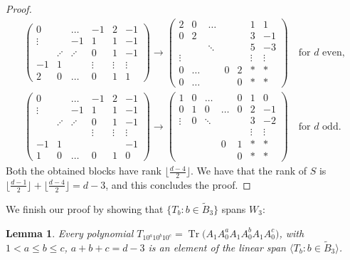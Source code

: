 \documentclass[pdftex]{sigma}
\numberwithin{equation}{section}
\newtheorem{Lemma}[Theorem]{Lemma}
\DeclareMathOperator{\Tr}{Tr}
\begin{document}
\begin{proof}
\begin{gather*}
 \begin{pmatrix}
0 	&	& \dots  & -1 & 2 & -1 \\
\vdots& 	&     -1   & 1 & 1 & -1 \\
&  	\iddots	& \iddots& 0 & 1 & -1 \\
 -1&  1  	&		 &\vdots&\vdots&\vdots\\
 2 &0& \dots &0&1&1
 \end{pmatrix} \to
 \begin{pmatrix}
 2 & 0 & \dots &&& 1 & 1\\
 0 & 2 & &&&3&-1\\
   &  & \ddots&&&5&-3\\
 \vdots & &&&&\vdots&\vdots\\
 0 &\dots&&0&2&*& *\\
 0 &\dots&&&0&*& *
 \end{pmatrix}\quad \text{for }d \text{ even},
\\
 \begin{pmatrix}
0 	&	& \dots  & -1 & 2 & -1 \\
\vdots& 	&       -1 & 1 & 1 & -1 \\
&  	\iddots	& \iddots& 0 & 1 & -1 \\
&    	&		 &\vdots&\vdots&\vdots\\
-1& 1 & &&&-1\\
1 &0& \dots &0&1&0
 \end{pmatrix} \to
\begin{pmatrix}
1       & 0 &\dots&     &0 &1 &0 \\
0       & 1 & 0       &\dots&0 &2 &-1\\
\vdots  & 0 &\ddots   &&&3&-2\\
 &  &&&&\vdots&\vdots\\
 &&&0&1&*&*\\
 &&&&0&*&*
 \end{pmatrix}\quad \text{for }d\text{ odd}.
 \end{gather*}
Both the obtained blocks have rank $\big\lfloor \frac{d-4}{2}\big\rfloor$. We have that the rank of $S$ is $\big\lfloor \frac{d-1}{2}\big\rfloor+\big\lfloor \frac{d-4}{2}\big\rfloor=d-3$, and this concludes the proof.
\end{proof}

We finish our proof by showing that $\big\{T_b\colon b\in \tilde{B}_3\big\}$ spans $W_3$:
\begin{Lemma}\label{lemma:w3Spanning}
	Every polynomial
	 $T_{10^a10^b10^c}=\Tr\big(A_1A_0^aA_1A_0^bA_1A_0^c\big)$, with $1< a\leq b\leq c$, $a+b+c=d-3$ is an element of the linear span $\big\langle T_b\colon b\in \tilde{B}_3\big\rangle$.
\end{Lemma}
\end{document}
